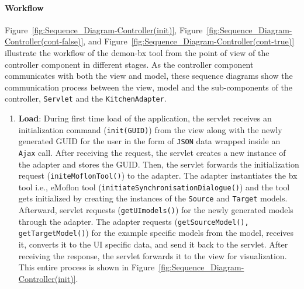 \paragraph{Workflow}
Figure~\ref{fig:Sequence_Diagram-Controller(init)}, 
Figure~\ref{fig:Sequence_Diagram-Controller(cont-false)},
and Figure~\ref{fig:Sequence_Diagram-Controller(cont-true)} illustrate the workflow of the demon-bx tool from the point of view of the controller component in different stages. As the controller component communicates with both the view and model, these sequence diagrams show the communication process between the view, model and the sub-components of the controller, \texttt{Servlet} and the \texttt{KitchenAdapter}.

\begin{enumerate}
	\item {\textbf{Load}: During first time load of the application, the servlet receives an initialization command (\texttt{init(GUID)}) from the view along with the newly generated GUID for the user in the form of \texttt{JSON} data wrapped inside an \texttt{Ajax} call. After receiving the request, the servlet creates a new instance of the adapter and stores the GUID. Then, the servlet forwards the initialization request (\texttt{initeMoflonTool()}) to the adapter. The adapter instantiates the bx tool i.e., eMoflon tool (\texttt{initiateSynchronisationDialogue()}) and the tool gets initialized by creating the instances of the \texttt{Source} and \texttt{Target} models. Afterward, servlet requests 
	(\texttt{getUImodels()}) for the newly generated models through the adapter. The adapter requests (\texttt{getSourceModel(), getTargetModel()}) for the example specific models from the model, receives it, converts it to the UI specific data, and send it back to the servlet. After receiving the response, the servlet forwards it to the view for visualization. This entire process is shown in Figure~\ref{fig:Sequence_Diagram-Controller(init)}.}
		

\end{enumerate}
